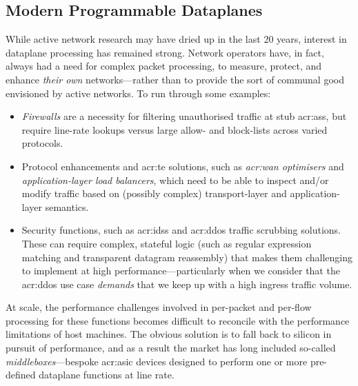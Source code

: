 \subsection{Modern Programmable Dataplanes}\label{sec:modern-pdps}
While active network research may have dried up in the last 20 years, interest in dataplane processing has remained strong.
Network operators have, in fact, always had a need for complex packet processing, to measure, protect, and enhance \emph{their own} networks---rather than to provide the sort of communal good envisioned by active networks.
To run through some examples:
\begin{itemize}
	\item \emph{Firewalls} are a necessity for filtering unauthorised traffic at stub \glspl{acr:as}, but require line-rate lookups versus large allow- and block-lists across varied protocols.
	\item Protocol enhancements and \gls{acr:te} solutions, such as \emph{\gls{acr:wan} optimisers} and \emph{application-layer load balancers}, which need to be able to inspect and/or modify traffic based on (possibly complex) transport-layer and application-layer semantics.
	\item Security functions, such as \glspl{acr:ids} and \gls{acr:ddos} traffic scrubbing solutions. These can require complex, stateful logic (such as regular expression matching and transparent datagram reassembly) that makes them challenging to implement at high performance---particularly when we consider that the \gls{acr:ddos} use case \emph{demands} that we keep up with a high ingress traffic volume.
\end{itemize}
At scale, the performance challenges involved in per-packet and per-flow processing for these functions becomes difficult to reconcile with the performance limitations of host machines.
The obvious solution is to fall back to silicon in pursuit of performance, and as a result the market has long included so-called \emph{middleboxes}---bespoke \gls{acr:asic} devices designed to perform one or more pre-defined dataplane functions at line rate.

